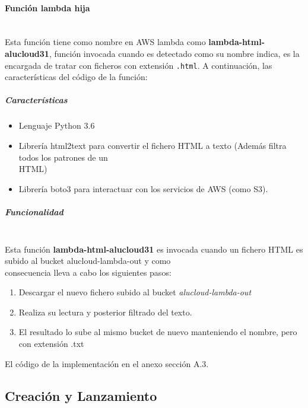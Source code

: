 \documentclass[
]{article}
\begin{document}
\hypertarget{header-n92}{%
\paragraph{Función lambda hija}\label{header-n92}}
\leavevmode
\newline
\\
Esta función tiene como nombre en AWS lambda como
\textbf{lambda-html-alucloud31}, función invocada cuando es detectado
como su nombre indica, es la encargada de tratar con ficheros con
extensión \texttt{.html}. A continuación, las características del código
de la función:

\hypertarget{header-n94}{%
\subparagraph{Características}\label{header-n94}}

\begin{itemize}
\item
  Lenguaje Python 3.6
\item
  Librería html2text para convertir el fichero HTML a texto (Además
  filtra todos los patrones de un\\
  HTML)
\item
  Librería boto3 para interactuar con los servicios de AWS (como S3).
\end{itemize}

\hypertarget{header-n102}{%
\subparagraph{Funcionalidad}\label{header-n102}}
\leavevmode
\newline
\\
Esta función \textbf{lambda-html-alucloud31} es invocada cuando un fichero HTML es subido al bucket
alucloud-lambda-out y como\\
consecuencia lleva a cabo los siguientes pasos:

\begin{enumerate}
\def\labelenumi{\arabic{enumi}.}
\item
  Descargar el nuevo fichero subido al bucket \emph{alucloud-lambda-out}
\item
  Realiza su lectura y posterior filtrado del texto.
\item
  El resultado lo sube al mismo bucket de nuevo manteniendo el nombre,
  pero con extensión .txt
\end{enumerate}

El código de la implementación en el anexo sección A.3.
\newline
\hypertarget{header-n112}{%
\subsection{Creación y Lanzamiento}\label{header-n112}}
\end{document}
